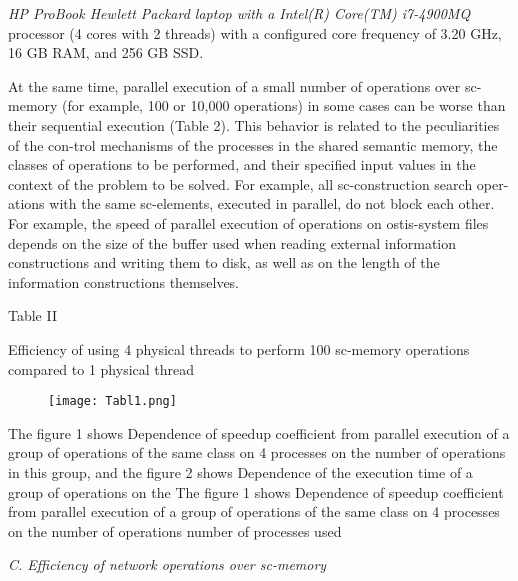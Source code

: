 \documentclass[10pt, a4paper]{article}
\begin{document}
\begin{multicols}{2}

\textit{HP ProBook Hewlett Packard laptop with a Intel(R)
Core(TM) i7-4900MQ} processor (4 cores with 2 threads)
with a configured core frequency of 3.20 GHz, 16 GB
RAM, and 256 GB SSD.

At the same time, parallel execution of a small number
of operations over sc-memory (for example, 100 or
10,000 operations) in some cases can be worse than their
sequential execution (Table 2).
This behavior is related to the peculiarities of the con-trol mechanisms of the processes in the shared semantic
memory, the classes of operations to be performed, and
their specified input values in the context of the problem
to be solved. For example, all sc-construction search oper-ations with the same sc-elements, executed in parallel, do
not block each other. For example, the speed of parallel
execution of operations on ostis-system files depends
on the size of the buffer used when reading external
information constructions and writing them to disk, as
well as on the length of the information constructions
themselves.

\begin{center}
\footnotesize Table II
\end{center}

\begin{center}
\footnotesize Efficiency of using 4 physical threads to perform 100
sc-memory operations compared to 1 physical thread
\end{center}


    
    \begin{figure} [H]

        \centering
        \texttt{[image: Tabl1.png]}
        
    \end{figure}
    The figure 1 shows Dependence of speedup coefficient
from parallel execution of a group of operations of the
same class on 4 processes on the number of operations
in this group, and the figure 2 shows Dependence of the
execution time of a group of operations on the The figure 1 shows Dependence of speedup coefficient from parallel execution of a group of operations of the
same class on 4 processes on the number of operations
number of processes used


        \begin{center}
          \textit{C. Efficiency of network operations over sc-memory} \setlength{\parskip}{0pt}
\setlength{\itemsep}{0pt}  
        \end{center}


\end{multicols}
\end{document}
